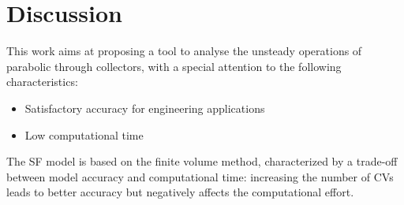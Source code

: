 \documentclass[final,3p,times,review]{elsarticle}
\begin{document}
\section{Discussion} \label{Sec:Disccusion}
%
This work aims at proposing a tool to analyse the unsteady operations of parabolic through collectors, with a special
attention to the following characteristics:
%
\begin{itemize}
	\item Satisfactory accuracy for engineering applications
	\item Low computational time
\end{itemize}
%
The SF model is based on the finite volume method, characterized by a trade-off between model accuracy and computational time: increasing the number of CVs leads to better accuracy but negatively affects
the computational effort.
\end{document}

